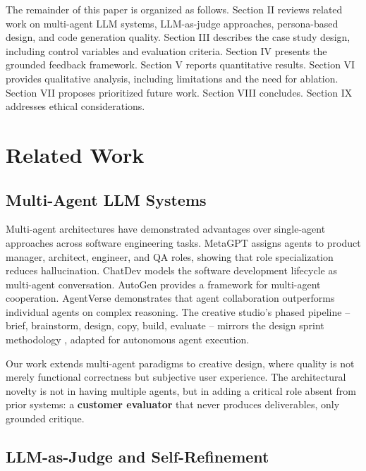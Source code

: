 \documentclass[conference]{IEEEtran}
\begin{document}
The remainder of this paper is organized as follows. Section II reviews related work on multi-agent LLM systems, LLM-as-judge approaches, persona-based design, and code generation quality. Section III describes the case study design, including control variables and evaluation criteria. Section IV presents the grounded feedback framework. Section V reports quantitative results. Section VI provides qualitative analysis, including limitations and the need for ablation. Section VII proposes prioritized future work. Section VIII concludes. Section IX addresses ethical considerations.

\section{Related Work}\label{related-work}

\subsection{Multi-Agent LLM Systems}\label{multi-agent-llm-systems}

Multi-agent architectures have demonstrated advantages over single-agent approaches across software engineering tasks. MetaGPT \cite{hong2024metagpt} assigns agents to product manager, architect, engineer, and QA roles, showing that role specialization reduces hallucination. ChatDev \cite{qian2024chatdev} models the software development lifecycle as multi-agent conversation. AutoGen \cite{wu2024autogen} provides a framework for multi-agent cooperation. AgentVerse \cite{chen2024agentverse} demonstrates that agent collaboration outperforms individual agents on complex reasoning. The creative studio's phased pipeline -- brief, brainstorm, design, copy, build, evaluate -- mirrors the design sprint methodology \cite{knapp2016sprint}, adapted for autonomous agent execution.

Our work extends multi-agent paradigms to creative design, where quality is not merely functional correctness but subjective user experience. The architectural novelty is not in having multiple agents, but in adding a critical role absent from prior systems: a \textbf{customer evaluator} that never produces deliverables, only grounded critique.

\subsection{LLM-as-Judge and Self-Refinement}\label{llm-as-judge-and-self-refinement}
\end{document}

